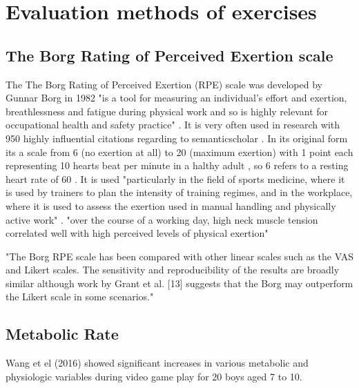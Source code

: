 \chapter{Evaluation methods of exercises}

\section{The Borg Rating of Perceived Exertion scale}
The The Borg Rating of Perceived Exertion (RPE) scale was developed by Gunnar Borg in 1982 \cite{borg1982psychophysical} "is a tool for measuring an individual’s effort and exertion, breathlessness and fatigue during physical work and so is highly relevant for occupational health and safety practice" \cite{williams2017borg}. It is very often used in research with 950 highly influential citations regarding to semanticscholar \cite{link_borginfluence}. In its original form its a scale from 6 (no exertion at all) to 20 (maximum exertion) with 1 point each representing 10 hearts beat per minute in a halthy adult \cite{williams2017borg}, so 6 refers to a resting heart rate of 60 \cite{link_borgrating}.
It is used "particularly in the field of sports medicine, where it is used by trainers to plan the intensity of training regimes, and in the workplace, where it is used to assess the exertion used in manual handling and physically active work" \cite{williams2017borg}.
"over the course of a working day, high neck muscle tension correlated well with high perceived levels of physical exertion" \cite{williams2017borg, jakobsen2014borg}

"The Borg RPE scale has been compared with other linear scales such as the VAS and Likert scales. The sensitivity and reproducibility of the results are broadly similar although work by Grant et al. [13] suggests that the Borg may outperform the Likert scale in some scenarios." \cite{williams2017borg}


\section{Metabolic Rate}
Wang et el (2016) \cite{wang2006metabolic} showed significant increases in various metabolic and physiologic variables during video game play for 20 boys aged 7 to 10.



















